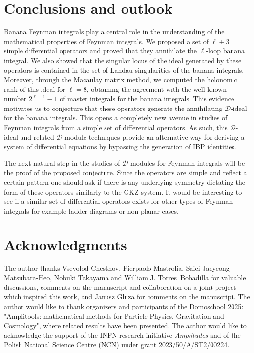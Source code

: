 \documentclass[11pt]{article}
\begin{document}
\section{Conclusions and outlook}\label{sec:conclusion}
Banana Feynman integrals play a central role in the understanding of the mathematical properties of Feynman integrals. We proposed a set of $\ell +3$ simple differential operators and proved that they annihilate the $\ell$-loop banana integral. We also showed that the singular locus of the ideal generated by these operators is contained in the set of Landau singularities of the banana integrals. Moreover, through the Macaulay matrix method, we computed the holonomic rank of this ideal for $\ell = 8$, obtaining the agreement with the well-known number $2^{\ell +1}-1$ of master integrals for the banana integrals. This evidence motivates us to conjecture that these operators generate the annihilating $\mathcal{D}$-ideal for the banana integrals. 
This opens a completely new avenue in studies of Feynman integrals 
from a simple set of differential operators. As such, this $\mathcal{D}$-ideal and related $\mathcal{D}$-module techniques provide an alternative way for deriving a system of differential equations by bypassing the generation of IBP identities.

The next natural step in the studies of $\mathcal{D}$-modules for Feynman integrals will be the proof of the proposed conjecture. Since the operators are simple and reflect a certain pattern one should ask if there is any underlying symmetry dictating the form of these operators similarly to the GKZ system. It would be interesting to see if a similar set of differential operators exists for other types of Feynman integrals for example ladder diagrams or non-planar cases.  


%
%
%


\section*{Acknowledgments}
The author thanks Vsevolod Chestnov, Pierpaolo Mastrolia, Saiei-Jaeyeong Matsubara-Heo, Nobuki Takayama and William J. Torres~Bobadilla for valuable discussions, comments on the manuscript and collaboration on a joint project which inspired this work, and Janusz Gluza for comments on the manuscript. 
The author would like to thank organizers and participants of the Domoschool 2025: "Amplitools: mathematical methods for Particle Physics, Gravitation and Cosmology", where related results have been presented.
The author would like to acknowledge the support of the INFN research initiative {\it Amplitudes} and of the Polish National Science Centre (NCN) under grant 2023/50/A/ST2/00224.


\appendix
% 




\end{document}
